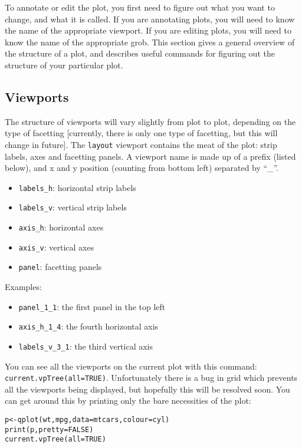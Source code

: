 To annotate or edit the plot, you first need to figure out what you want to change, and what it is called.  If you are annotating plots, you will need to know the name of the appropriate viewport.  If you are editing plots, you will need to know the name of the appropriate grob.  This section gives a general overview of the structure of a plot, and describes useful commands for figuring out the structure of your particular plot.

\subsection{Viewports}\label{sub:viewports}

The structure of viewports will vary slightly from plot to plot, depending on the type of facetting [currently, there is only one type of facetting, but this will change in future].  The {\tt layout} viewport contains the meat of the plot: strip labels, axes and facetting panels.  A viewport name is made up of  a prefix (listed below), and x and y position (counting from bottom left) separated by ``\_''.

\begin{itemize}
  \item {\tt labels\_h}: horizontal strip labels
  \item {\tt labels\_v}: vertical strip labels
  \item {\tt axis\_h}: horizontal axes
  \item {\tt axis\_v}: vertical axes
  \item {\tt panel}: facetting panels
\end{itemize}

Examples:

\begin{itemize}
  \item {\tt panel\_1\_1}: the first panel in the top left
  \item {\tt axis\_h\_1\_4}: the fourth horizontal axis
  \item {\tt labels\_v\_3\_1}: the third vertical axis
\end{itemize}

You can see all the viewports on the current plot with this command: {\tt current.vpTree(all=TRUE)}.  Unfortunately there is a bug in grid which prevents all the viewports being displayed, but hopefully this will be resolved soon.  You can get around this by printing only the bare necessities of the plot:

\begin{alltt}
p <- qplot(wt, mpg, data=mtcars, colour=cyl)
print(p, pretty = FALSE)
current.vpTree(all=TRUE)
\end{alltt}

